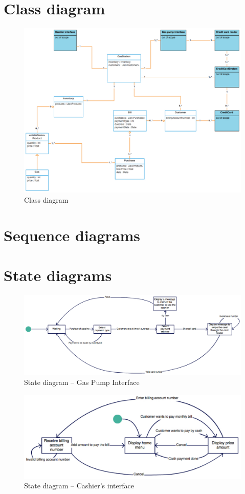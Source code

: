 \documentclass[11pt, a4paper]{article}
\begin{document}
\section{Class diagram}

\begin{figure}[h]
\centering
\includegraphics[width=\textwidth]{Class_diagram.pdf}
\caption{Class diagram}
\end{figure}


\section{Sequence diagrams}


\section{State diagrams}

\begin{figure}[h]
\centering
\includegraphics[width=\textwidth]{GasPumpInterface_diagram.pdf}
\caption{State diagram -- Gas Pump Interface}
\end{figure}


\begin{figure}[h]
\centering
\includegraphics[width=\textwidth]{CashierInterface_diagram.pdf}
\caption{State diagram -- Cashier's interface}
\end{figure}
\end{document}

